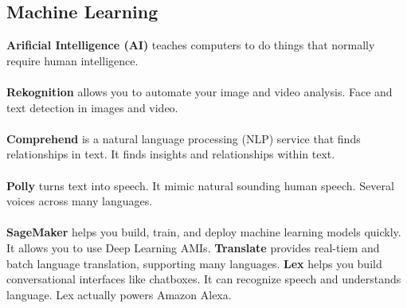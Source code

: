 \documentclass{article}%
\begin{document}
\subsection{Machine Learning}
\textbf{Arificial Intelligence (AI)} teaches computers to do things that normally require human intelligence. \\ \\ 
\textbf{Rekognition} allows you to automate your image and video analysis. Face and text detection in images and video. \\ \\
\textbf{Comprehend} is a natural language processing (NLP) service that finds relationships in text. It finds insights and relationships within text. \\ \\ 
\textbf{Polly} turns text into speech. It mimic natural sounding human speech. Several voices across many languages. \\ \\
\textbf{SageMaker} helps you build, train, and deploy machine learning models quickly. It allows you to use Deep Learning AMIs.
\textbf{Translate} provides real-tiem and batch language translation, supporting many languages.
\textbf{Lex} helps you build conversational interfaces like chatboxes. It can recognize speech and understands language. Lex actually powers Amazon Alexa.
\end{document}
